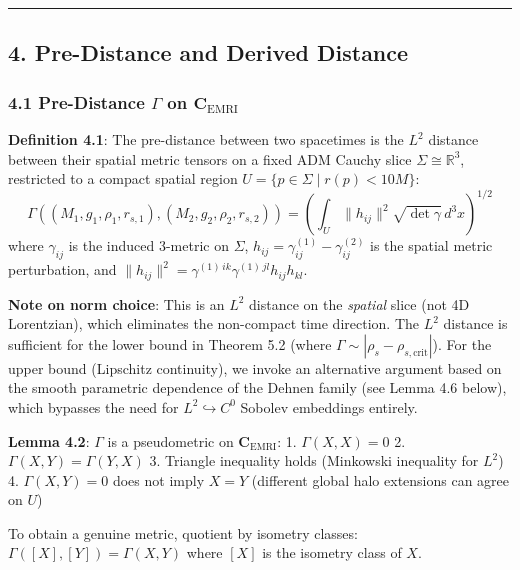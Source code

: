 \documentclass[
]{article}
\begin{document}
\begin{center}\rule{0.5\linewidth}{0.5pt}\end{center}

\subsection{4. Pre-Distance and Derived
Distance}\label{pre-distance-and-derived-distance}

\subsubsection{\texorpdfstring{4.1 Pre-Distance \(\Gamma\) on
\(\mathbf{C}_{\text{EMRI}}\)}{4.1 Pre-Distance \textbackslash Gamma on \textbackslash mathbf\{C\}\_\{\textbackslash text\{EMRI\}\}}}\label{pre-distance-gamma-on-mathbfc_textemri}

\textbf{Definition 4.1}: The pre-distance between two spacetimes is the
\(L^2\) distance between their spatial metric tensors on a fixed ADM
Cauchy slice \(\Sigma \cong \mathbb{R}^3\), restricted to a compact
spatial region \(U = \{p \in \Sigma \mid r(p) < 10M\}\):
\[\Gamma((M_1, g_1, \rho_1, r_{s,1}), (M_2, g_2, \rho_2, r_{s,2})) = \left(\int_U \|h_{ij}\|^2 \sqrt{\det \gamma} \, d^3x\right)^{1/2}\]
where \(\gamma_{ij}\) is the induced 3-metric on \(\Sigma\),
\(h_{ij} = \gamma^{(1)}_{ij} - \gamma^{(2)}_{ij}\) is the spatial metric
perturbation, and
\(\|h_{ij}\|^2 = \gamma^{(1)\,ik}\gamma^{(1)\,jl}h_{ij}h_{kl}\).

\textbf{Note on norm choice}: This is an \(L^2\) distance on the
\emph{spatial} slice (not 4D Lorentzian), which eliminates the
non-compact time direction. The \(L^2\) distance is sufficient for the
lower bound in Theorem 5.2 (where
\(\Gamma \sim |\rho_s - \rho_{s,\text{crit}}|\)). For the upper bound
(Lipschitz continuity), we invoke an alternative argument based on the
smooth parametric dependence of the Dehnen family (see Lemma 4.6 below),
which bypasses the need for \(L^2 \hookrightarrow C^0\) Sobolev
embeddings entirely.

\textbf{Lemma 4.2}: \(\Gamma\) is a pseudometric on
\(\mathbf{C}_{\text{EMRI}}\): 1. \(\Gamma(X, X) = 0\) 2.
\(\Gamma(X, Y) = \Gamma(Y, X)\) 3. Triangle inequality holds (Minkowski
inequality for \(L^2\)) 4. \(\Gamma(X, Y) = 0\) does not imply \(X = Y\)
(different global halo extensions can agree on \(U\))

To obtain a genuine metric, quotient by isometry classes:
\(\Gamma([X], [Y]) = \Gamma(X, Y)\) where \([X]\) is the isometry class
of \(X\).
\end{document}
